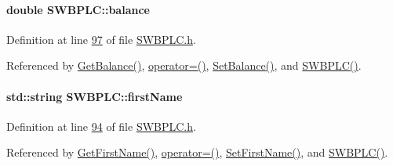 \paragraph[{\texorpdfstring{balance}{balance}}]{\setlength{\rightskip}{0pt plus 5cm}double S\+W\+B\+P\+L\+C\+::balance\hspace{0.3cm}{\ttfamily [private]}}\hypertarget{class_s_w_b_p_l_c_a34365efdc6dde37a4da9a6222dcde389_a34365efdc6dde37a4da9a6222dcde389}{}\label{class_s_w_b_p_l_c_a34365efdc6dde37a4da9a6222dcde389_a34365efdc6dde37a4da9a6222dcde389}


Definition at line \hyperlink{_s_w_b_p_l_c_8h_source_l00097}{97} of file \hyperlink{_s_w_b_p_l_c_8h_source}{S\+W\+B\+P\+L\+C.\+h}.



Referenced by \hyperlink{_s_w_b_p_l_c_8cpp_source_l00069}{Get\+Balance()}, \hyperlink{_s_w_b_p_l_c_8h_source_l00063}{operator=()}, \hyperlink{_s_w_b_p_l_c_8cpp_source_l00065}{Set\+Balance()}, and \hyperlink{_s_w_b_p_l_c_8h_source_l00024}{S\+W\+B\+P\+L\+C()}.

\paragraph[{\texorpdfstring{first\+Name}{firstName}}]{\setlength{\rightskip}{0pt plus 5cm}std\+::string S\+W\+B\+P\+L\+C\+::first\+Name\hspace{0.3cm}{\ttfamily [private]}}\hypertarget{class_s_w_b_p_l_c_a38fd4817afe4aaac4993b0b4c7074b9c_a38fd4817afe4aaac4993b0b4c7074b9c}{}\label{class_s_w_b_p_l_c_a38fd4817afe4aaac4993b0b4c7074b9c_a38fd4817afe4aaac4993b0b4c7074b9c}


Definition at line \hyperlink{_s_w_b_p_l_c_8h_source_l00094}{94} of file \hyperlink{_s_w_b_p_l_c_8h_source}{S\+W\+B\+P\+L\+C.\+h}.



Referenced by \hyperlink{_s_w_b_p_l_c_8cpp_source_l00093}{Get\+First\+Name()}, \hyperlink{_s_w_b_p_l_c_8h_source_l00063}{operator=()}, \hyperlink{_s_w_b_p_l_c_8cpp_source_l00089}{Set\+First\+Name()}, and \hyperlink{_s_w_b_p_l_c_8h_source_l00024}{S\+W\+B\+P\+L\+C()}.

